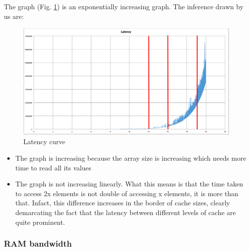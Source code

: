 \documentclass[conference]{IEEEtran}
\begin{document}
The graph (Fig. \ref{fig:latency}) is an exponentially increasing graph. The inference drawn by us are:

\begin{figure}[h]
\centering
\includegraphics[scale=0.2]{latency.png}
\caption{Latency curve}
\label{fig:latency}
\end{figure}


\begin{itemize}
\item
The graph is increasing because the array size is increasing which needs more time to read all its values
\item
The graph is not increasing linearly. What this means is that the time taken to access 2x elements is not double of accessing x elements, it is more than that. Infact, this difference increases in the border of cache sizes, clearly demarcating the fact that the latency between different levels of cache are quite prominent.
\end{itemize}





\subsubsection{RAM bandwidth}
\end{document}
